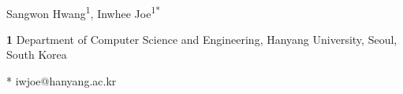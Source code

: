 \documentclass[10pt,letterpaper]{article}
\begin{document}
\vspace*{0.2in}

\begin{flushleft}
{\Large
\textbf{} %
}
\newline
\\
Sangwon Hwang\textsuperscript{1},
Inwhee Joe\textsuperscript{1*}


\bigskip
\textbf{1} Department of Computer Science and Engineering, Hanyang University, Seoul, South Korea
\\
\bigskip

% 
%





* iwjoe@hanyang.ac.kr
\end{flushleft}
\end{document}
